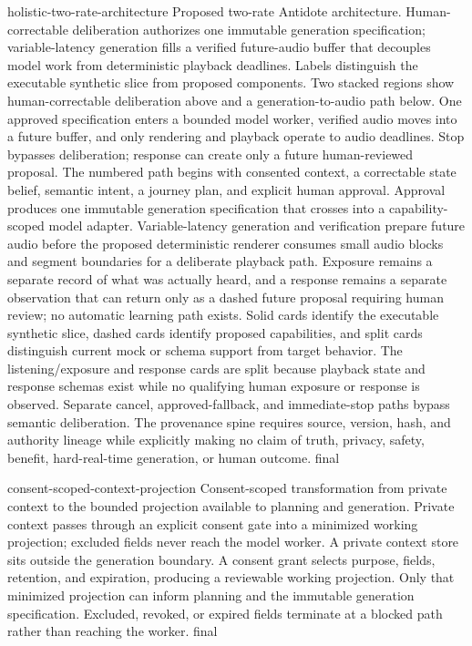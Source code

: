 \AntidoteDeclareVisualText
  {holistic-two-rate-architecture}
  {Proposed two-rate Antidote architecture. Human-correctable deliberation authorizes one immutable generation specification; variable-latency generation fills a verified future-audio buffer that decouples model work from deterministic playback deadlines. Labels distinguish the executable synthetic slice from proposed components.}
  {Two stacked regions show human-correctable deliberation above and a generation-to-audio path below. One approved specification enters a bounded model worker, verified audio moves into a future buffer, and only rendering and playback operate to audio deadlines. Stop bypasses deliberation; response can create only a future human-reviewed proposal.}
  {The numbered path begins with consented context, a correctable state belief, semantic intent, a journey plan, and explicit human approval. Approval produces one immutable generation specification that crosses into a capability-scoped model adapter. Variable-latency generation and verification prepare future audio before the proposed deterministic renderer consumes small audio blocks and segment boundaries for a deliberate playback path. Exposure remains a separate record of what was actually heard, and a response remains a separate observation that can return only as a dashed future proposal requiring human review; no automatic learning path exists. Solid cards identify the executable synthetic slice, dashed cards identify proposed capabilities, and split cards distinguish current mock or schema support from target behavior. The listening/exposure and response cards are split because playback state and response schemas exist while no qualifying human exposure or response is observed. Separate cancel, approved-fallback, and immediate-stop paths bypass semantic deliberation. The provenance spine requires source, version, hash, and authority lineage while explicitly making no claim of truth, privacy, safety, benefit, hard-real-time generation, or human outcome.}
  {final}

\AntidoteDeclareVisualText
  {consent-scoped-context-projection}
  {Consent-scoped transformation from private context to the bounded projection available to planning and generation.}
  {Private context passes through an explicit consent gate into a minimized working projection; excluded fields never reach the model worker.}
  {A private context store sits outside the generation boundary. A consent grant selects purpose, fields, retention, and expiration, producing a reviewable working projection. Only that minimized projection can inform planning and the immutable generation specification. Excluded, revoked, or expired fields terminate at a blocked path rather than reaching the worker.}
  {final}

